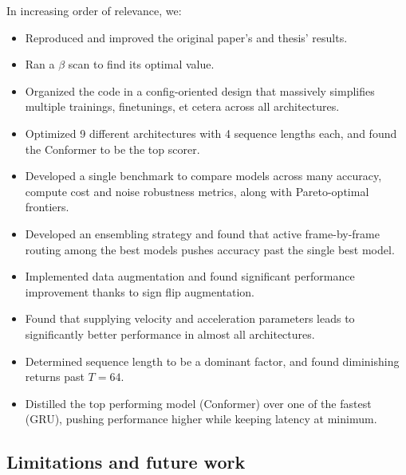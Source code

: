 \documentclass[
reprint,
aps,
prd,
superscriptaddress,
nofootinbib
]{revtex4-2}
\begin{document}
In increasing order of relevance, we:
\begin{itemize}
    \item[o] Reproduced and improved the original paper's and thesis' results.
    \item[o] Ran a $\beta$ scan to find its optimal value.
    \item[o] Organized the code in a config-oriented design that massively simplifies multiple trainings, finetunings, et cetera across all architectures.
    \item[o] Optimized 9 different architectures with 4 sequence lengths each, and found the Conformer to be the top scorer.
    \item[o] Developed a single benchmark to compare models across many accuracy, compute cost and noise robustness metrics, along with Pareto-optimal frontiers.
    \item Developed an ensembling strategy and found that active frame-by-frame routing among the best models pushes accuracy past the single best model.
    \item Implemented data augmentation and found significant performance improvement thanks to sign flip augmentation.
    \item Found that supplying velocity and acceleration parameters leads to significantly better performance in almost all architectures.
    \item Determined sequence length to be a dominant factor, and found diminishing returns past $T=64$.
    \item Distilled the top performing model (Conformer) over one of the fastest (GRU), pushing performance higher while keeping latency at minimum.
\end{itemize}



\subsection{Limitations and future work}
\end{document}

